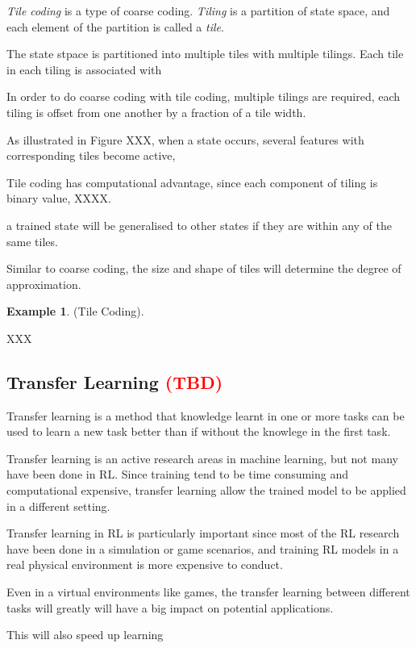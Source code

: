 \documentclass[11pt,twoside]{report}
\theoremstyle{plain}
\theoremstyle{definition}
\newtheorem{examp}{Example}[section]
\begin{document}
\textit{Tile coding} is a type of coarse coding. \textit{Tiling} is a partition of state space, and each element of the partition is called a \textit{tile}.

The state stpace is partitioned into multiple tiles with multiple tilings. Each tile in each tiling is associated with

In order to do coarse coding with tile coding, multiple tilings are required, each tiling is offset from one another by a fraction of a tile width.

As illustrated in Figure XXX, when a state occurs, several features with corresponding tiles become active,

Tile coding has computational advantage, since each component of tiling is binary value,  XXXX.

a trained state will be generalised to other states if they are within any of the same tiles.

Similar to coarse coding, the size and shape of tiles will determine the degree of approximation.

\begin{examp} \normalfont (Tile Coding).

XXX
\end{examp}

\subsection{Transfer Learning \textcolor{red}{(TBD)}}
\label{transfer_learning}

Transfer learning is a method that knowledge learnt in one or more tasks can be used to learn a new task better than if without the knowlege in the first task.

Transfer learning is an active research areas in machine learning, but not many have been done in RL.
Since training tend to be time consuming and computational expensive, transfer learning allow the trained model to be applied in a different setting.

Transfer learning in RL is particularly important since most of the RL research have been done in a simulation or game scenarios, and training RL models in a real physical environment is more expensive to conduct.

Even in a virtual environments like games,  the transfer learning between different tasks will greatly will have a big impact on potential applications.

This will also speed up learning
\end{document}
